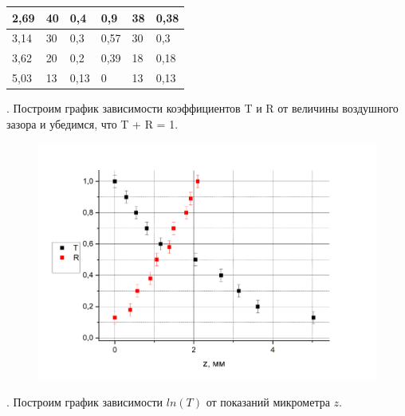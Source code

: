 \documentclass[a4paper,12pt]{article} %
\begin{document}
\begin{table}[h!]
\begin{tabular}{|lll|lll|}
\multicolumn{1}{|l|}{2,69}            & \multicolumn{1}{l|}{40}                           & 0,4  & \multicolumn{1}{l|}{0,9}             & \multicolumn{1}{l|}{38}                         & 0,38 \\ \hline
\multicolumn{1}{|l|}{3,14}            & \multicolumn{1}{l|}{30}                           & 0,3  & \multicolumn{1}{l|}{0,57}            & \multicolumn{1}{l|}{30}                         & 0,3  \\ \hline
\multicolumn{1}{|l|}{3,62}            & \multicolumn{1}{l|}{20}                           & 0,2  & \multicolumn{1}{l|}{0,39}            & \multicolumn{1}{l|}{18}                         & 0,18 \\ \hline
\multicolumn{1}{|l|}{5,03}            & \multicolumn{1}{l|}{13}                           & 0,13 & \multicolumn{1}{l|}{0}               & \multicolumn{1}{l|}{13}                         & 0,13 \\ \hline
\end{tabular}
\end{table}


. Построим график зависимости коэффициентов T и R от величины воздушного зазора и убедимся, что T + R = 1.\\

\begin{figure}[!h]
\begin{center}
\includegraphics[width = 15cm]{graph2}
\end{center}
\end{figure}

. Построим график зависимости $ln(T)$ от показаний микрометра $z$.
\end{document}
